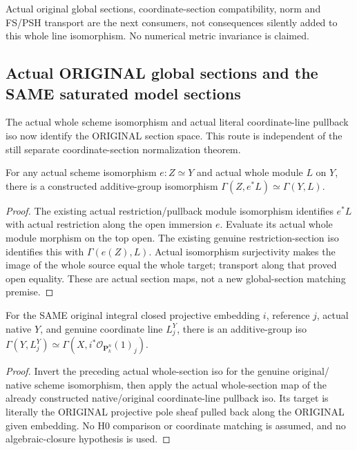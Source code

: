 Actual original global sections, coordinate-section compatibility, norm and
FS/PSH transport are the next consumers, not consequences silently added
to this whole line isomorphism. No numerical metric invariance is claimed.
\subsection{Actual ORIGINAL global sections and the SAME saturated model sections}
The actual whole scheme isomorphism and actual literal coordinate-line
pullback iso now identify the ORIGINAL section space. This route is
independent of the still separate coordinate-section normalization theorem.

\begin{definition}
\label{def:seven-original-iso-pullback-whole-sections-route}
\leanok
{}
For any actual scheme isomorphism $e:Z\simeq Y$ and actual whole module
$L$ on $Y$, there is a constructed additive-group isomorphism
$\Gamma(Z,e^*L)\simeq\Gamma(Y,L)$.
\end{definition}
\begin{proof}
The existing actual restriction/pullback module isomorphism identifies
$e^*L$ with actual restriction along the open immersion $e$. Evaluate its
actual whole module morphism on the top open. The existing genuine
restriction-section iso identifies this with $\Gamma(e(Z),L)$. Actual
isomorphism surjectivity makes the image of the whole source equal the
whole target; transport along that proved open equality. These are actual
section maps, not a new global-section matching premise.
\end{proof}

\begin{definition}
\label{def:seven-original-native-coordinate-global-sections-iso-route}
\leanok
{}
For the SAME original integral closed projective embedding $i$, reference
$j$, actual native $Y$, and genuine coordinate line $L_j^Y$, there is an
additive-group iso $\Gamma(Y,L_j^Y)\simeq
\Gamma(X,i^*\mathcal O_{\mathbf P^n_k}(1)_j)$.
\end{definition}
\begin{proof}
Invert the preceding actual whole-section iso for the genuine original/
native scheme isomorphism, then apply the actual whole-section map of the
already constructed native/original coordinate-line pullback iso. Its
target is literally the ORIGINAL projective pole sheaf pulled back along
the ORIGINAL given embedding. No H0 comparison or coordinate matching is
assumed, and no algebraic-closure hypothesis is used.
\end{proof}

